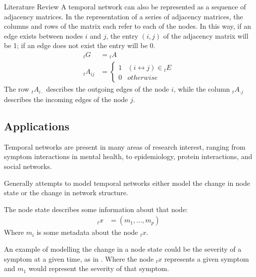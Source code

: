 \documentclass[12pt]{amsbook}
\begin{document}
\begin{chapter}{Literature Review}
        A temporal network can also be represented as a sequence of adjacency matrices. In the representation of a series of adjacency matrices, the columns and rows of the matrix each refer to each of the nodes. In this way, if an edge exists between nodes $i$ and $j$, the entry $(i,j)$ of the adjacency matrix will be 1; if an edge does not exist the entry will be 0.
        \begin{align}
            _t G &= {_t} A\\
            _t A_{ij} &=  
            \left\{
                \begin{array}{ll} 
                1 & (i\leftrightarrow j)\in {_t} E\\
                0 & otherwise
                \end{array}
            \right.
        \end{align}
        The row $_t A_{i\cdot}$ describes the outgoing edges of the node $i$, while the column $_t A_{\cdot j}$ describes the incoming edges of the node $j$.

        \subsection{Applications}
        Temporal networks are present in many areas of research interest, ranging from symptom interactions in mental health\cite{jordan2020current,contreras2020temporal}, to epidemiology\cite{masuda2013predicting}, protein interactions\cite{lucas2021inferring,jin2009identifying}, and social networks\cite{moinet2015burstiness,hanneke2010discrete}.     
        
        Generally attempts to model temporal networks either model the change in node state or the change in network structure.
        
        The node state describes some information about that node:
        \begin{align}
            _t x &= (m_1,\ldots, m_p)
        \end{align}
        Where $m_i$ is some metadata about the node $_t x$.

        An example of modelling the change in a node state could be the severity of a symptom at a given time, as in \cite{contreras2020temporal}. Where the node $_t x$ represents a given symptom and $m_1$ would represent the severity of that symptom. 



\end{chapter}
\end{document}
